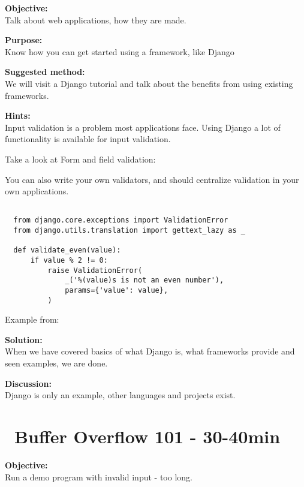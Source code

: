 \documentclass[a4paper,11pt,notitlepage]{report}
\begin{document}
{\bf Objective:}\\
Talk about web applications, how they are made.

{\bf Purpose:}\\
Know how you can get started using a framework, like Django\\ 

{\bf Suggested method:}\\
We will visit a Django tutorial and talk about the benefits from using existing frameworks.

{\bf Hints:}\\
Input validation is a problem most applications face. Using Django a lot of functionality is available for input validation.

Take a look at Form and field validation:\\

You can also write your own validators, and should centralize validation in your own applications.

\begin{verbatim}

  from django.core.exceptions import ValidationError
  from django.utils.translation import gettext_lazy as _

  def validate_even(value):
      if value % 2 != 0:
          raise ValidationError(
              _('%(value)s is not an even number'),
              params={'value': value},
          )
\end{verbatim}

Example from:

{\bf Solution:}\\
When we have covered basics of what Django is, what frameworks provide and seen examples, we are done.

{\bf Discussion:}\\
Django is only an example, other languages and projects exist.


\chapter{\faInfoCircle\ Buffer Overflow 101 - 30-40min}
\label{ex:bufferoverflow}


{\bf Objective:}\\
Run a demo program with invalid input - too long.
\end{document}
